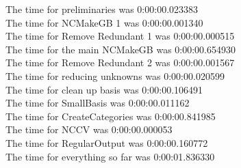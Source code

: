 \documentclass[rep10,leqno]{report}
\begin{document}
\noindent
The time for preliminaries was 0:00:00.023383\\
The time for NCMakeGB 1 was 0:00:00.001340\\
The time for Remove Redundant 1 was 0:00:00.000515\\
The time for the main NCMakeGB was 0:00:00.654930\\
The time for Remove Redundant 2 was 0:00:00.001567\\
The time for reducing unknowns was 0:00:00.020599\\
The time for clean up basis was 0:00:00.106491\\
The time for SmallBasis was 0:00:00.011162\\
The time for CreateCategories was 0:00:00.841985\\
The time for NCCV was 0:00:00.000053\\
The time for RegularOutput was 0:00:00.160772\\
The time for everything so far was 0:00:01.836330\\
\end{document}
